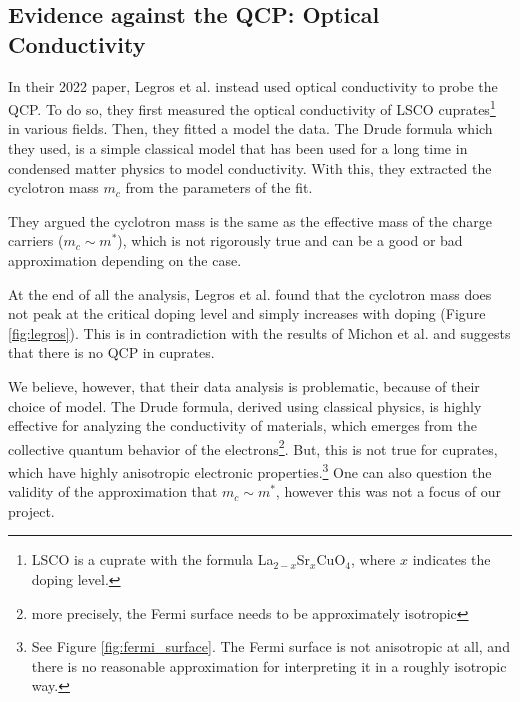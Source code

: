 \subsection{Evidence against the QCP: Optical Conductivity}
In their 2022 paper, Legros et al.\cite{legros2022} instead used optical conductivity to
probe the QCP. To do so, they first measured the optical conductivity of LSCO cuprates\footnote{
LSCO is a cuprate with the formula La$_{2-x}$Sr$_x$CuO$_4$, where $x$ indicates the doping level.} in various fields. 
Then, they fitted a model the data. 
The Drude formula which they used, is a simple classical model that has been used for a long time in condensed matter physics to model conductivity. 
With this, they extracted the cyclotron mass $m_c$ from the parameters of the fit.

They argued the cyclotron mass is the same as the effective mass of the charge carriers
($m_c \sim m^*$), which is not rigorously true and can be a good or bad approximation depending on the case.

At the end of all the analysis, Legros et al.\cite{legros2022} found that the cyclotron mass does not peak
at the critical doping level and simply increases with doping (Figure \ref{fig:legros}). This is in contradiction with the
results of Michon et al. and suggests that there is no QCP in cuprates.

We believe, however, that their data analysis is problematic, because of their choice of model. 
The Drude formula, derived using classical physics, is highly effective for
analyzing the conductivity of materials, which emerges from the collective quantum behavior of the
electrons\footnote{more precisely, the Fermi surface needs to be approximately isotropic}. 
But, this is not true for cuprates, 
which have highly anisotropic electronic properties.\footnote{See Figure
\ref{fig:fermi_surface}. The Fermi surface is not anisotropic at all, and there is no reasonable
approximation for interpreting it in a roughly isotropic way.} 
One can also question the validity of the approximation that $m_c \sim m^*$, 
however this was not a focus of our project.
